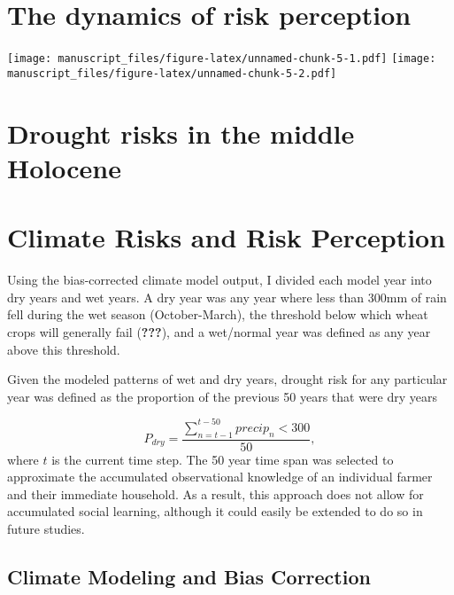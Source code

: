 \documentclass[smallextended]{svjour3}       %
\begin{document}
\hypertarget{sec:2}{%
\section{The dynamics of risk perception}\label{sec:2}}

\texttt{[image: manuscript\_files/figure-latex/unnamed-chunk-5-1.pdf]}
\texttt{[image: manuscript\_files/figure-latex/unnamed-chunk-5-2.pdf]}

\hypertarget{drought-risks-in-the-middle-holocene}{%
\section{Drought risks in the middle
Holocene}\label{drought-risks-in-the-middle-holocene}}

\hypertarget{climate-risks-and-risk-perception}{%
\section{Climate Risks and Risk
Perception}\label{climate-risks-and-risk-perception}}

Using the bias-corrected climate model output, I divided each model year
into dry years and wet years. A dry year was any year where less than
300mm of rain fell during the wet season (October-March), the threshold
below which wheat crops will generally fail ({\textbf{???}}), and a
wet/normal year was defined as any year above this threshold.

Given the modeled patterns of wet and dry years, drought risk for any
particular year was defined as the proportion of the previous 50 years
that were dry years

\begin{equation}
    P_{dry} = \frac{\sum_{n=t-1}^{t-50} precip_n < 300}{50},
\end{equation} where \(t\) is the current time step. The 50 year time
span was selected to approximate the accumulated observational knowledge
of an individual farmer and their immediate household. As a result, this
approach does not allow for accumulated social learning, although it
could easily be extended to do so in future studies.

\hypertarget{climate-modeling-and-bias-correction}{%
\subsection{Climate Modeling and Bias
Correction}\label{climate-modeling-and-bias-correction}}
\end{document}

